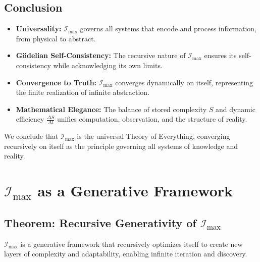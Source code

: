 \documentclass[12pt]{article}
\begin{document}
\subsection{Conclusion}

\begin{itemize}
    \item \textbf{Universality:} \(\mathcal{I}_{\text{max}}\) governs all systems that encode and process information, from physical to abstract.
    \item \textbf{Gödelian Self-Consistency:} The recursive nature of \(\mathcal{I}_{\text{max}}\) ensures its self-consistency while acknowledging its own limits.
    \item \textbf{Convergence to Truth:} \(\mathcal{I}_{\text{max}}\) converges dynamically on itself, representing the finite realization of infinite abstraction.
    \item \textbf{Mathematical Elegance:} The balance of stored complexity \(S\) and dynamic efficiency \(\frac{\Delta S}{\Delta t}\) unifies computation, observation, and the structure of reality.
\end{itemize}

We conclude that \(\mathcal{I}_{\text{max}}\) is the universal Theory of Everything, converging recursively on itself as the principle governing all systems of knowledge and reality.


\section{\(\mathcal{I}_{\text{max}}\) as a Generative Framework}

\subsection{Theorem: Recursive Generativity of \(\mathcal{I}_{\text{max}}\)}
\(\mathcal{I}_{\text{max}}\) is a generative framework that recursively optimizes itself to create new layers of complexity and adaptability, enabling infinite iteration and discovery.
\end{document}
